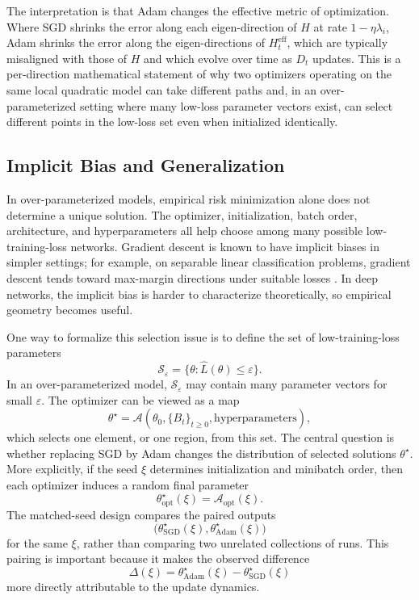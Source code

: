 \documentclass[11pt]{article}
\begin{document}
The interpretation is that Adam changes the effective metric of optimization. Where SGD shrinks the error along each eigen-direction of $H$ at rate $1-\eta\lambda_i$, Adam shrinks the error along the eigen-directions of $H_t^{\mathrm{eff}}$, which are typically misaligned with those of $H$ and which evolve over time as $D_t$ updates. This is a per-direction mathematical statement of why two optimizers operating on the same local quadratic model can take different paths and, in an over-parameterized setting where many low-loss parameter vectors exist, can select different points in the low-loss set even when initialized identically.

\subsection{Implicit Bias and Generalization}

In over-parameterized models, empirical risk minimization alone does not determine a unique solution. The optimizer, initialization, batch order, architecture, and hyperparameters all help choose among many possible low-training-loss networks. Gradient descent is known to have implicit biases in simpler settings; for example, on separable linear classification problems, gradient descent tends toward max-margin directions under suitable losses \cite{soudry2018implicit}. In deep networks, the implicit bias is harder to characterize theoretically, so empirical geometry becomes useful.

One way to formalize this selection issue is to define the set of low-training-loss parameters
\[
\mathcal{S}_\varepsilon
= \{\theta : \widehat L(\theta) \le \varepsilon\}.
\]
In an over-parameterized model, $\mathcal{S}_\varepsilon$ may contain many parameter vectors for small $\varepsilon$. The optimizer can be viewed as a map
\[
\theta^\star
= \mathcal{A}(\theta_0,\{B_t\}_{t\ge 0},\mathrm{hyperparameters}),
\]
which selects one element, or one region, from this set. The central question is whether replacing SGD by Adam changes the distribution of selected solutions $\theta^\star$. More explicitly, if the seed $\xi$ determines initialization and minibatch order, then each optimizer induces a random final parameter
\[
\theta^\star_{\mathrm{opt}}(\xi)
=
\mathcal{A}_{\mathrm{opt}}(\xi).
\]
The matched-seed design compares the paired outputs
\[
\big(\theta^\star_{\mathrm{SGD}}(\xi),\theta^\star_{\mathrm{Adam}}(\xi)\big)
\]
for the same $\xi$, rather than comparing two unrelated collections of runs. This pairing is important because it makes the observed difference
\[
\Delta(\xi)
=
\theta^\star_{\mathrm{Adam}}(\xi)-\theta^\star_{\mathrm{SGD}}(\xi)
\]
more directly attributable to the update dynamics.
\end{document}

